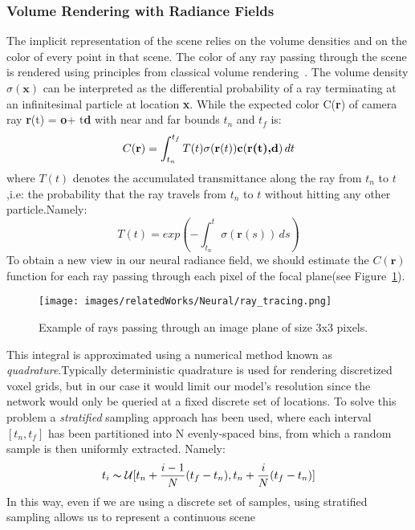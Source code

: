 \subsubsection{Volume Rendering with Radiance Fields}
The implicit representation of the scene relies on the volume densities and on the color
of every point in that scene. The color of any ray passing through the scene is rendered using
principles from classical volume rendering~\cite{nerf16}. The volume density $\sigma(\textbf{x})$
can be interpreted as the differential probability of a ray terminating at an infinitesimal
particle at location \textbf{x}. While the expected color C(\textbf{r}) of camera ray 
\textbf{r}(t) = \textbf{o}+ t\textbf{d} with near and far bounds $t_n$ and $t_f$ is:
\begin{equation}
    C(\textbf{r}) = \int_{t_n}^{t_f} T(t)\sigma(\textbf{r}(t))\textbf{c}(\textbf{\textbf{r}(t),\textbf{d}}) \,dt 
\end{equation} 
where $T(t)$ denotes the accumulated transmittance along the ray from $t_n$ to $t$,i.e:
the probability that the ray travels from $t_n$ to $t$ without hitting any other particle.Namely:
\begin{equation}
    T(t) = exp(-\int_{t_n}^{t}\sigma(\textbf{r}(s))\,ds)
\end{equation}
To obtain a new view in our neural radiance field, we should estimate the $C(\textbf{r})$
function for each ray passing through each pixel of the focal plane(see Figure~\ref{fig:rt}).
\begin{figure}[t]
    \centering
    \texttt{[image: images/relatedWorks/Neural/ray\_tracing.png]} 
    \caption{Example of rays passing through an image plane of size 3x3 pixels.}\label{fig:rt}
\end{figure}
This integral is approximated using a numerical method known as \textit{quadrature}.Typically deterministic 
quadrature is used for rendering discretized voxel grids, but in our case it would limit our model's resolution
since the network would only be queried at a fixed discrete set of locations. To solve this problem a
\textit{stratified} sampling approach has been used, where each interval $[t_n,t_f]$ has been partitioned
into N evenly-spaced bins, from which a random sample is then uniformly extracted. Namely:
\begin{equation}
    t_i  \thicksim \mathcal{U} [t_n + \frac{i-1}{N}(t_f-t_n), t_n + \frac{i}{N}(t_f-t_n)]
\end{equation}
In this way, even if we are using a discrete set of samples, using stratified sampling allows us to represent a continuous scene 
